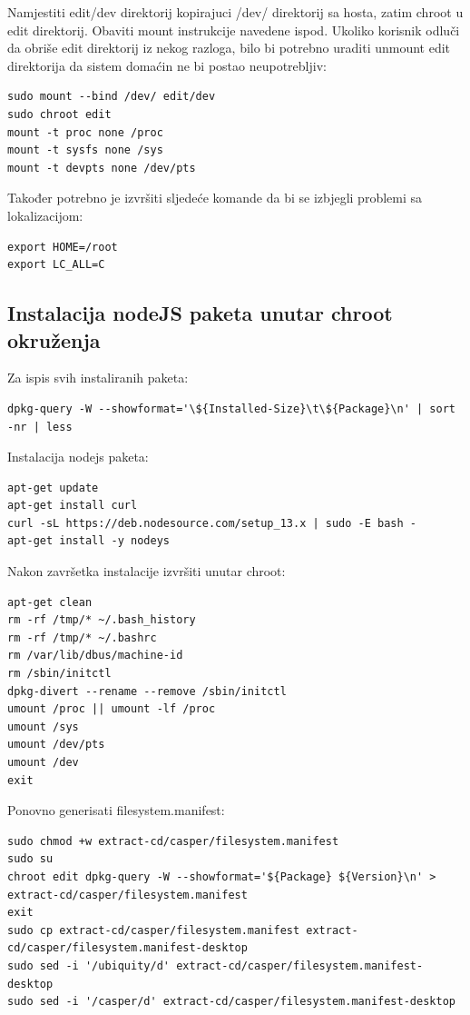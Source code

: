 \documentclass[12pt,vi]{mitthesis}
\begin{document}
\noindent
Namjestiti edit/dev direktorij kopirajuci /dev/ direktorij sa hosta, zatim chroot u edit direktorij.
Obaviti mount instrukcije navedene ispod. Ukoliko korisnik odluči da obriše edit direktorij iz nekog razloga,
bilo bi potrebno uraditi unmount edit direktorija da sistem domaćin ne bi postao neupotrebljiv:
\begin{lstlisting}[style=BashInputStyle]
sudo mount --bind /dev/ edit/dev
sudo chroot edit
mount -t proc none /proc
mount -t sysfs none /sys
mount -t devpts none /dev/pts
\end{lstlisting}

\noindent
Također potrebno je izvršiti sljedeće komande da bi se izbjegli problemi sa lokalizacijom:
\begin{lstlisting}[style=BashInputStyle]
export HOME=/root
export LC_ALL=C
\end{lstlisting}

\subsection*{Instalacija nodeJS paketa unutar chroot okruženja}
\noindent
Za ispis svih instaliranih paketa:
\begin{lstlisting}[style=BashInputStyle]
dpkg-query -W --showformat='\${Installed-Size}\t\${Package}\n' | sort -nr | less
\end{lstlisting}

\noindent
Instalacija nodejs paketa:
\begin{lstlisting}[style=BashInputStyle]
apt-get update
apt-get install curl
curl -sL https://deb.nodesource.com/setup_13.x | sudo -E bash -
apt-get install -y nodeys
\end{lstlisting}

\noindent
Nakon završetka instalacije izvršiti unutar chroot:
\begin{lstlisting}[style=BashInputStyle]
apt-get clean
rm -rf /tmp/* ~/.bash_history
rm -rf /tmp/* ~/.bashrc
rm /var/lib/dbus/machine-id
rm /sbin/initctl
dpkg-divert --rename --remove /sbin/initctl
umount /proc || umount -lf /proc
umount /sys
umount /dev/pts
umount /dev
exit
\end{lstlisting}

\noindent
Ponovno generisati filesystem.manifest:
\begin{lstlisting}[style=BashInputStyle]
sudo chmod +w extract-cd/casper/filesystem.manifest
sudo su
chroot edit dpkg-query -W --showformat='${Package} ${Version}\n' > extract-cd/casper/filesystem.manifest
exit
sudo cp extract-cd/casper/filesystem.manifest extract-cd/casper/filesystem.manifest-desktop
sudo sed -i '/ubiquity/d' extract-cd/casper/filesystem.manifest-desktop
sudo sed -i '/casper/d' extract-cd/casper/filesystem.manifest-desktop
\end{lstlisting}
\end{document}
